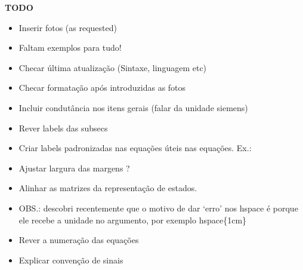 \documentclass{article}
\numberwithin{equation}{section}
\begin{document}
    \begin{center}{\textbf{\Large TODO}}\end{center}
    \begin{itemize}
        \item Inserir fotos (as requested) %
        \item Faltam exemplos para tudo!
        \item Checar última atualização (Sintaxe, linguagem etc)
        \item Checar formatação após introduzidas as fotos
        \item Incluir condutância nos itens gerais (falar da unidade siemens)
        \item Rever labels das subsecs
        \item Criar labels padronizadas nas equações úteis nas equações. Ex.: %
        \item Ajustar largura das margens ?
        \item Alinhar as matrizes da representação de estados.
        \item OBS.: descobri recentemente que o motivo de dar `erro' nos hspace é porque ele recebe a unidade no argumento, por exemplo hspace\{1cm\}
        \item Rever a numeração das equações
        \item Explicar convenção de sinais
    \end{itemize}
\end{document}
